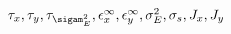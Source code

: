 \documentclass{article}
\begin{document}
$ \tau_x, \tau_y, \tau_{\sigam_E^2}, \epsilon_x^\infty, \epsilon_y^\infty, \sigma_E^2, \sigma_s, J_x, J_y $
\pagebreak
\end{document}
